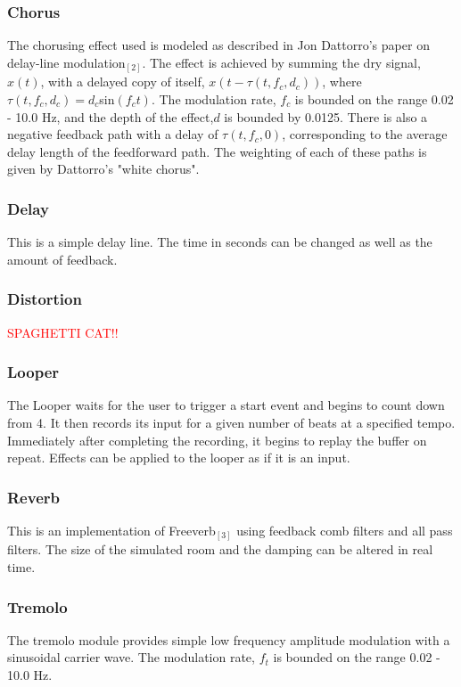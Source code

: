 \documentclass[pdftext,twoside,10pt]{article}
\newcommand{\spag}{\textcolor{red}{SPAGHETTI CAT!!}}
\begin{document}
\subsubsection*{Chorus} 
The chorusing effect used is modeled as described in Jon Dattorro's paper on delay-line modulation$_{[2]}$. The effect is achieved by summing the dry signal, $x(t)$, with a delayed copy of itself, $x(t - \tau(t,f_c,d_c))$, where $\tau(t,f_c,d_c) =d_c$sin$(f_ct)$. The modulation rate, $f_c$ is bounded on the range 0.02 - 10.0 Hz, and the depth of the effect,$d$ is bounded by 0.0125. There is also a negative feedback path with a delay of $\tau(t,f_c,0)$, corresponding to the average delay length of the feedforward path. The weighting of each of these paths is given by Dattorro's "white chorus".

\subsubsection*{Delay}
This is a simple delay line. The time in seconds can be changed as well as the amount of feedback.

\subsubsection*{Distortion}
\spag

\subsubsection*{Looper}
The Looper waits for the user to trigger a start event and begins to count down from 4. It then records its input for a given number of beats at a specified tempo. Immediately after completing the recording, it begins to replay the buffer on repeat. Effects can be applied to the looper as if it is an input. 

\subsubsection*{Reverb}
This is an implementation of Freeverb$_{[3]}$ using feedback comb filters and all pass filters. The size of the simulated room and the damping can be altered in real time.

\subsubsection*{Tremolo} 
The tremolo module provides simple low frequency amplitude modulation with a sinusoidal carrier wave. The modulation rate, $f_t$ is bounded on the range 0.02 - 10.0 Hz.
\end{document}
